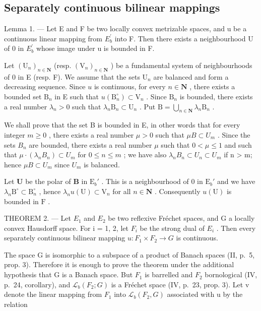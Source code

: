 \subsection{Separately continuous bilinear mappings}

Lemma 1. --- Let E and F be two locally convex metrizable spaces, and u be a continuous linear mapping from \(E_{b}^{\prime}\) into F. Then there exists a neighbourhood U of 0 in \(E_{b}^{\prime}\) whose image under u is bounded in F.

Let \((\mathrm{U}_n)_{n\in \mathbf{N}}\) (resp. \((\mathrm{V}_n)_{n\in \mathbf{N}}\) ) be a fundamental system of neighbourhoods of 0 in E (resp. F). We assume that the sets \(\mathrm{U}_n\) are balanced and form a decreasing sequence. Since \(u\) is continuous, for every \(n\in \mathbf{N}\) , there exists a bounded set \(\mathrm{B}_n\) in E such that \(u(\mathrm{B}_n^\circ)\subset \mathrm{V}_n\) . Since \(\mathrm{B}_n\) is bounded, there exists a real number \(\lambda_n > 0\) such that \(\lambda_{n}\mathrm{B}_{n}\subset \mathrm{U}_{n}\) . Put \(\mathrm{B} = \bigcup_{n\in \mathbf{N}}\lambda_n\mathrm{B}_n\) .

We shall prove that the set B is bounded in E, in other words that for every integer \(m \geqslant 0\) , there exists a real number \(\mu > 0\) such that \(\mu B \subset U_{m}\) . Since the sets \(B_{n}\) are bounded, there exists a real number \(\mu\) such that \(0 < \mu \leqslant 1\) and such that \(\mu \cdot (\lambda_{n} B_{n}) \subset U_{m}\) for \(0 \leqslant n \leqslant m\) ; we have also \(\lambda_{n} B_{n} \subset U_{n} \subset U_{m}\) if n \textgreater{} m; hence \(\mu B \subset U_{m}\) since \(U_{m}\) is balanced.

Let \(\mathbf{U}\) be the polar of \(\mathbf{B}\) in \(\mathrm{E}_b'\) . This is a neighbourhood of 0 in \(\mathrm{E}_b'\) and we have \(\lambda_n\mathrm{B}^\circ \subset \mathrm{B}_n^\circ\) , hence \(\lambda_n u(\mathrm{U}) \subset \mathrm{V}_n\) for all \(n \in \mathbf{N}\) . Consequently \(u(\mathrm{U})\) is bounded in \(\mathrm{F}\) .

THEOREM 2. --- Let \(E_{1}\) and \(E_{2}\) be two reflexive Fréchet spaces, and G a locally convex Hausdorff space. For i = 1, 2, let \(F_{i}\) be the strong dual of \(E_{i}\) . Then every separately continuous bilinear mapping \(u: F_{1} \times F_{2} \to G\) is continuous.

The space G is isomorphic to a subspace of a product of Banach spaces (II, p.~5, prop. 3). Therefore it is enough to prove the theorem under the additional hypothesis that G is a Banach space. But \(F_{1}\) is barrelled and \(F_{2}\) bornological (IV, p.~24, corollary), and \(\mathcal{L}_{b}(F_{2}; G)\) is a Fréchet space (IV, p.~23, prop. 3). Let v denote the linear mapping from \(F_{1}\) into \(\mathcal{L}_{b}(F_{2}, G)\) associated with u by the relation

